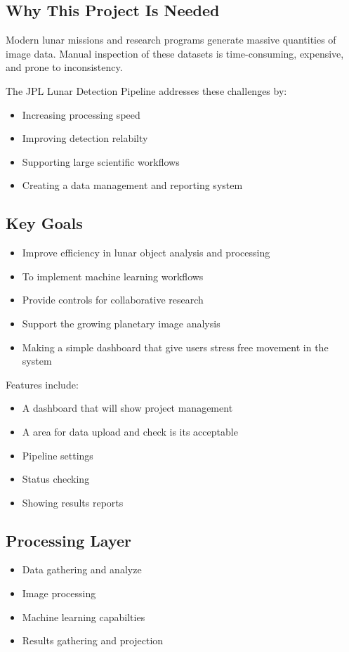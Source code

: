 \documentclass[12pt]{article}
\begin{document}
\subsection{Why This Project Is Needed}

Modern lunar missions and research programs generate massive quantities of image data. Manual inspection of these datasets is time-consuming, expensive, and prone to inconsistency. 

The JPL Lunar Detection Pipeline addresses these challenges by:
\begin{itemize}
    \item Increasing processing speed
    \item Improving detection relabilty
    \item Supporting large scientific workflows
    \item Creating a data management and reporting system
\end{itemize}

\subsection{Key Goals}

\begin{itemize}
    \item Improve efficiency in lunar object analysis and processing 
    \item To implement machine learning workflows
    \item Provide controls for collaborative research
    \item Support the growing planetary image analysis 
    \item Making a simple dashboard that give users stress free movement in the system
\end{itemize}

Features include:
\begin{itemize}
    \item A dashboard that will show project management 
    \item A area for data upload and check is its acceptable
    \item Pipeline settings
    \item Status checking
    \item Showing results reports
\end{itemize}

\subsection{Processing Layer}
\begin{itemize}
    \item Data gathering and analyze
    \item Image processing
    \item Machine learning capabilties
    \item Results gathering and projection
\end{itemize}
\end{document}
